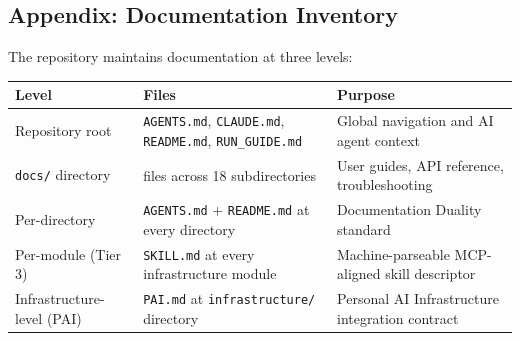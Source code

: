 \documentclass[
  english,
]{article}
\newcounter{none} %
\begin{document}
\newpage

\newpage

\subsection{Appendix: Documentation Inventory}\label{appendix-docs}

The repository maintains documentation at three levels:

\begin{table}[h]
\caption{Documentation inventory across the four-layer documentation architecture, from repository-wide system files to per-module skill descriptors.}
\label{tab:documentation-inventory}
\end{table}

{\def\LTcaptype{none} %
\begin{longtable}[]{@{}
  >{\raggedright\arraybackslash}p{}
  >{\centering\arraybackslash}p{}
  >{\raggedright\arraybackslash}p{}@{}}
\toprule\noalign{}
\begin{minipage}[b]{\linewidth}\raggedright
Level
\end{minipage} & \begin{minipage}[b]{\linewidth}\centering
Files
\end{minipage} & \begin{minipage}[b]{\linewidth}\raggedright
Purpose
\end{minipage} \\
\midrule\noalign{}
\endhead
\bottomrule\noalign{}
\endlastfoot
Repository root & \texttt{AGENTS.md}, \texttt{CLAUDE.md},
\texttt{README.md}, \texttt{RUN\_GUIDE.md} & Global navigation and AI
agent context \\
\texttt{docs/} directory & 390 files across 18 subdirectories & User
guides, API reference, troubleshooting \\
Per-directory & \texttt{AGENTS.md} + \texttt{README.md} at every
directory & Documentation Duality standard \\
Per-module (Tier 3) & \texttt{SKILL.md} at every infrastructure module &
Machine-parseable MCP-aligned skill descriptor \\
Infrastructure-level (PAI) & \texttt{PAI.md} at \texttt{infrastructure/}
directory & Personal AI Infrastructure integration contract \\
\end{longtable}
}
\end{document}
